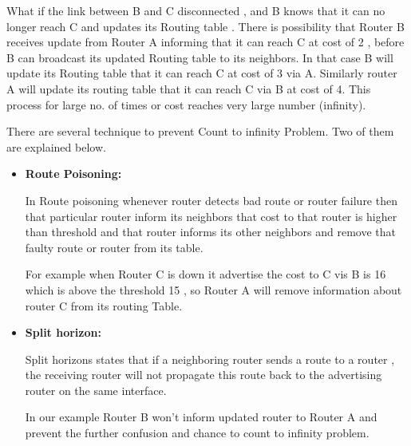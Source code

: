 \documentclass[a4paper,11pt]{article}
\begin{document}
\begin{A}
{        What if the link between B and C disconnected , and B knows that it can no longer reach C and updates its Routing table . There is possibility that Router B receives update from Router A informing that it can reach C at cost of 2 , before B can broadcast its updated Routing table to its neighbors. In that case B will update its Routing table that it can reach C at cost of 3 via A. Similarly router A will update its routing table that it can reach C via B at cost of 4. This process for large no. of times or cost reaches very large number (infinity).

        There are several technique to prevent Count to infinity Problem. Two of them are explained below.

        \begin{itemize}
            \item \textbf{Route Poisoning:}

                  In Route poisoning whenever router detects bad route or router failure then that particular router inform its neighbors that cost to that router is higher than threshold and that router informs its other neighbors and remove that faulty route or router from its table.

                  For example when Router C is down it advertise the cost to C vis B is 16 which is above the threshold 15 , so Router A will remove information about router C from its routing Table.

            \item \textbf{Split horizon:}


                  Split horizons states that if a neighboring router sends a route to a router , the receiving router will not propagate this route back to the advertising router on the same interface.

                  In our example Router B won't inform updated router to Router A and prevent the further confusion and chance to count to infinity problem.


        \end{itemize}
    }
\end{A}
\end{document}
